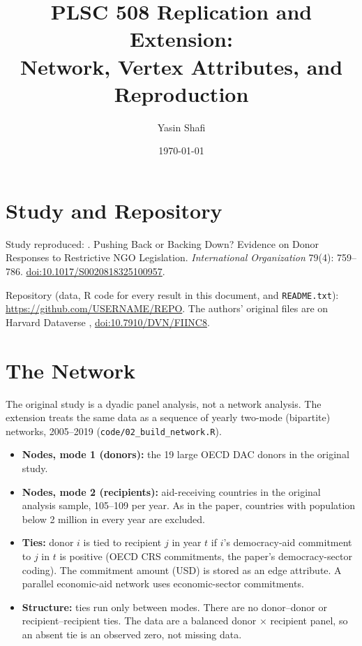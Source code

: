 \documentclass[11pt]{article}
\title{PLSC 508 Replication and Extension:\\ Network, Vertex Attributes, and Reproduction}
\author{Yasin Shafi}
\date{\today}
\newcommand{\replicationURL}{https://github.com/USERNAME/REPO}  %
\begin{document}
\sloppy
\maketitle

\section*{Study and Repository}

\noindent Study reproduced: \citet{right2025pushing}. Pushing Back or Backing Down? Evidence on Donor
Responses to Restrictive NGO Legislation. \textit{International Organization} 79(4): 759--786.
\href{https://doi.org/10.1017/S0020818325100957}{doi:10.1017/S0020818325100957}.

\medskip
\noindent Repository (data, R code for every result in this document, and \texttt{README.txt}):
\url{\replicationURL}.
The authors' original files are on Harvard Dataverse \citep{right2025replication},
\href{https://doi.org/10.7910/DVN/FIINC8}{doi:10.7910/DVN/FIINC8}.

\section{The Network}

The original study is a dyadic panel analysis, not a network analysis. The extension
treats the same data as a sequence of yearly two-mode (bipartite) networks, 2005--2019
(\texttt{code/02\_build\_network.R}).

\begin{itemize}
  \item \textbf{Nodes, mode 1 (donors):} the 19 large OECD DAC donors in the original study.
  \item \textbf{Nodes, mode 2 (recipients):} aid-receiving countries in the original analysis
        sample, 105--109 per year. As in the paper, countries with population below 2 million
        in every year are excluded.
  \item \textbf{Ties:} donor $i$ is tied to recipient $j$ in year $t$ if $i$'s democracy-aid
        commitment to $j$ in $t$ is positive (OECD CRS commitments, the paper's democracy-sector
        coding). The commitment amount (USD) is stored as an edge attribute. A parallel
        economic-aid network uses economic-sector commitments.
  \item \textbf{Structure:} ties run only between modes. There are no donor--donor or
        recipient--recipient ties. The data are a balanced donor $\times$ recipient panel, so
        an absent tie is an observed zero, not missing data.
\end{itemize}
\end{document}
